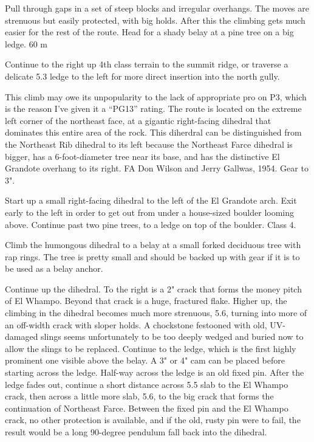 \documentclass{tahquitz}
\begin{document}
 Pull through gaps in a set of steep blocks and irregular
overhangs. The  moves are strenuous but easily protected, with big
holds. After this the climbing gets much easier for the rest of the
route. Head for a shady belay at a pine tree on a big ledge. 60 m

 Continue to the right up 4th class terrain to the summit ridge,
or traverse a delicate 5.3 ledge to the left for more direct
insertion into the north gully.





This climb may owe its unpopularity to the lack of appropriate pro on P3, which is
the reason I've given it a ``PG13'' rating.
The route is located on the extreme left corner of the northeast
face, at a gigantic right-facing dihedral that dominates this entire area of the
rock. This diherdral can be distinguished from the Northeast Rib dihedral to its left
because the Northeast Farce dihedral is bigger, has a 6-foot-diameter tree near its base,
and has the distinctive El Grandote overhang to its right.
FA Don Wilson and Jerry Gallwas, 1954. Gear to 3".

 Start up a small right-facing dihedral to the left of the El Grandote arch.
Exit early to the left in order to get out from under a house-sized boulder
looming above. Continue past two pine trees, to
a ledge on top of the boulder.
Class 4.

 Climb the humongous dihedral to a belay at a small forked deciduous tree with rap
rings. The tree is pretty small and should be backed up with gear if it is to be
used as a belay anchor.

 Continue up the dihedral. To the right is a 2" crack that forms
the money pitch of El Whampo. Beyond that crack is a huge, fractured flake.
Higher up, the climbing in the dihedral becomes much more strenuous, 5.6, turning
into more of an off-width crack with sloper holds. A chockstone festooned with
old, UV-damaged slings seems unfortunately to be too deeply wedged and buried
now to allow the slings to be replaced. Continue to the ledge, which is the first
highly prominent one visible above the belay. A 3" or 4" cam can be placed before
starting across the ledge. Half-way across the ledge is an old fixed pin. After the
ledge fades out, continue a short distance across 5.5 slab to the El Whampo crack,
then across a little more slab, 5.6, to the big crack that forms the continuation
of Northeast Farce.
Between the fixed pin and the El Whampo crack, no other protection is available,
and if the old, rusty pin were to fail, the result would be a long 90-degree pendulum
fall back into the dihedral.
\end{document}
